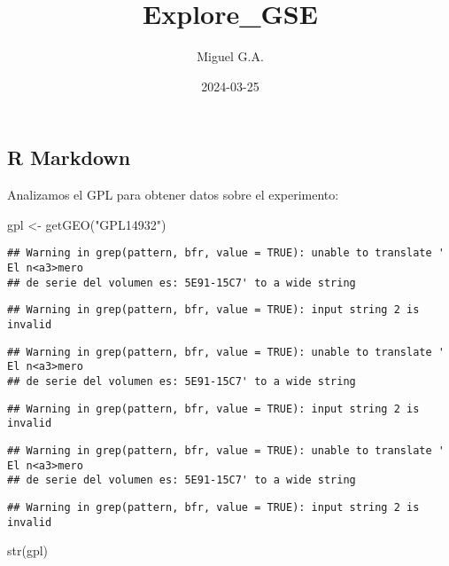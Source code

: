 \documentclass[
]{article}
\title{Explore\_GSE}
\author{Miguel G.A.}
\date{2024-03-25}
\newenvironment{Shaded}{\begin{snugshade}}{\end{snugshade}}
\newcommand{\FunctionTok}[1]{\textcolor[rgb]{0.00,0.00,0.00}{#1}}
\newcommand{\NormalTok}[1]{#1}
\newcommand{\OtherTok}[1]{\textcolor[rgb]{0.56,0.35,0.01}{#1}}
\newcommand{\StringTok}[1]{\textcolor[rgb]{0.31,0.60,0.02}{#1}}
\begin{document}
\maketitle

\hypertarget{r-markdown}{%
\subsection{R Markdown}\label{r-markdown}}

Analizamos el GPL para obtener datos sobre el experimento:

\begin{Shaded}
\begin{Highlighting}[]
\NormalTok{gpl }\OtherTok{\textless{}{-}} \FunctionTok{getGEO}\NormalTok{(}\StringTok{"GPL14932"}\NormalTok{)}
\end{Highlighting}
\end{Shaded}

\begin{verbatim}
## Warning in grep(pattern, bfr, value = TRUE): unable to translate ' El n<a3>mero
## de serie del volumen es: 5E91-15C7' to a wide string
\end{verbatim}

\begin{verbatim}
## Warning in grep(pattern, bfr, value = TRUE): input string 2 is invalid
\end{verbatim}

\begin{verbatim}
## Warning in grep(pattern, bfr, value = TRUE): unable to translate ' El n<a3>mero
## de serie del volumen es: 5E91-15C7' to a wide string
\end{verbatim}

\begin{verbatim}
## Warning in grep(pattern, bfr, value = TRUE): input string 2 is invalid
\end{verbatim}

\begin{verbatim}
## Warning in grep(pattern, bfr, value = TRUE): unable to translate ' El n<a3>mero
## de serie del volumen es: 5E91-15C7' to a wide string
\end{verbatim}

\begin{verbatim}
## Warning in grep(pattern, bfr, value = TRUE): input string 2 is invalid
\end{verbatim}

\begin{Shaded}
\begin{Highlighting}[]
\FunctionTok{str}\NormalTok{(gpl)}
\end{Highlighting}
\end{Shaded}
\end{document}
